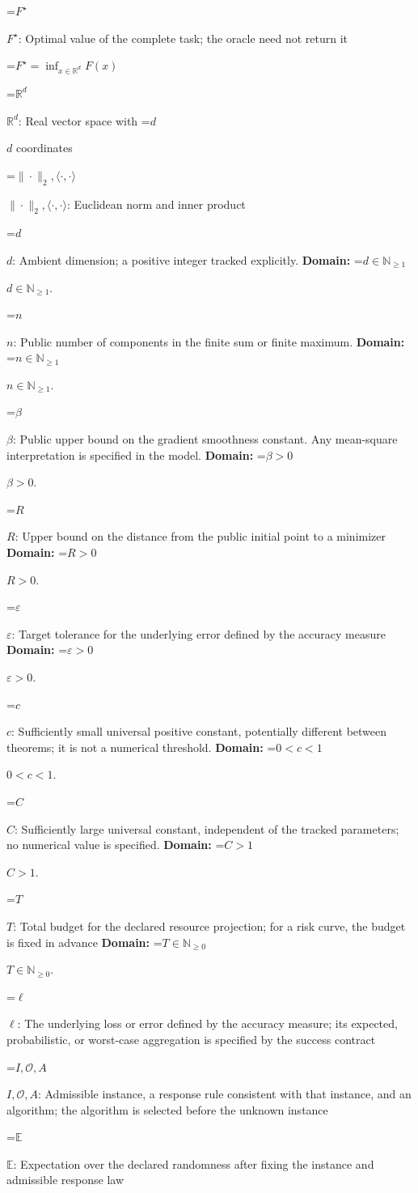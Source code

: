 \documentclass[10pt,a4paper]{article}
\newcommand{\AtlasMath}[1]{\par\begingroup\centering\setbox0=\hbox{$\displaystyle #1$}\ifdim\wd0>1.4\linewidth\typeout{ATLAS WIDE FORMULA: \the\wd0}\fi\ifdim\wd0>\linewidth\resizebox{\linewidth}{!}{\box0}\else\box0\fi\par\endgroup}
\newcommand{\AtlasInlineMath}[1]{\begingroup\setbox0=\hbox{$#1$}\ifdim\wd0>.4\linewidth\endgroup\AtlasMath{#1}\else\endgroup$#1$\fi}
\begin{document}
\AtlasInlineMath{F^\star}: Optimal value of the complete task; the oracle need not return it


\AtlasMath{F^\star=\inf_{x\in \mathbb{R}^d}F(x)}


\AtlasInlineMath{\mathbb{R}^d}: Real vector space with \AtlasInlineMath{d} coordinates

\AtlasInlineMath{\|\cdot\|_2,\langle\cdot,\cdot\rangle}: Euclidean norm and inner product

\AtlasInlineMath{d}: Ambient dimension; a positive integer tracked explicitly. \textbf{Domain:} \AtlasInlineMath{d\in\mathbb{N}_{\ge1}}.

\AtlasInlineMath{n}: Public number of components in the finite sum or finite maximum. \textbf{Domain:} \AtlasInlineMath{n\in\mathbb{N}_{\ge1}}.

\AtlasInlineMath{\beta}: Public upper bound on the gradient smoothness constant. Any mean-square interpretation is specified in the model. \textbf{Domain:} \AtlasInlineMath{\beta>0}.

\AtlasInlineMath{R}: Upper bound on the distance from the public initial point to a minimizer \textbf{Domain:} \AtlasInlineMath{R>0}.

\AtlasInlineMath{\varepsilon}: Target tolerance for the underlying error defined by the accuracy measure \textbf{Domain:} \AtlasInlineMath{\varepsilon>0}.

\AtlasInlineMath{c}: Sufficiently small universal positive constant, potentially different between theorems; it is not a numerical threshold. \textbf{Domain:} \AtlasInlineMath{0<c<1}.

\AtlasInlineMath{C}: Sufficiently large universal constant, independent of the tracked parameters; no numerical value is specified. \textbf{Domain:} \AtlasInlineMath{C>1}.

\AtlasInlineMath{T}: Total budget for the declared resource projection; for a risk curve, the budget is fixed in advance \textbf{Domain:} \AtlasInlineMath{T\in\mathbb{N}_{\ge0}}.

\AtlasInlineMath{\ell}: The underlying loss or error defined by the accuracy measure; its expected, probabilistic, or worst-case aggregation is specified by the success contract

\AtlasInlineMath{I,\mathcal{O},A}: Admissible instance, a response rule consistent with that instance, and an algorithm; the algorithm is selected before the unknown instance

\AtlasInlineMath{\mathbb{E}}: Expectation over the declared randomness after fixing the instance and admissible response law
\end{document}
